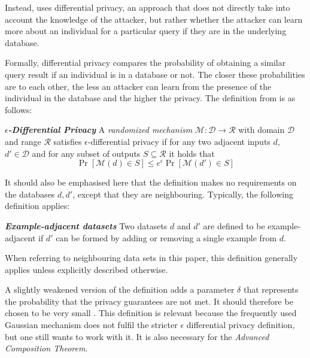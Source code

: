 Instead, \citeauthor{dwork:2006} uses differential privacy, an approach that does not directly take into account the knowledge of the attacker, but rather whether the attacker can learn more about an individual for a particular query if they are in the underlying database.

Formally, differential privacy compares the probability of obtaining a similar query result if an individual is in a database or not. The closer these probabilities are to each other, the less an attacker can learn from the presence of the individual in the database and the higher the privacy. The definition from \cite{dwork:2006} is as follows:

\begin{definition}\label{def:eps-differential-privacy}
	\emph{\textbf{$\epsilon$-Differential Privacy}} A \textit{randomized mechanism} $\mathcal{M}: \mathcal{D} \rightarrow \mathcal{R}$ with domain $\mathcal{D}$ and range $\mathcal{R}$ satisfies $\epsilon$-differential privacy if for any two adjacent inputs $d$, $d' \in \mathcal{D}$ and for any subset of outputs $S \subseteq \mathcal{R}$ it holds that $$\Pr[\mathcal{M}(d) \in S] \leq e^{\epsilon} \Pr[\mathcal{M}(d') \in S]$$
\end{definition}

It should also be emphasised here that the definition makes no requirements on the databases $d, d'$, except that they are neighbouring. Typically, the following definition applies:
\begin{definition}\label{def:example-adjacency}
	\emph{\textbf{Example-adjacent datasets}} Two datasets $d$ and $d'$ are defined to be example-adjacent if $d'$ can be formed by adding or removing a single example from $d$.
\end{definition}

When referring to neighbouring data sets in this paper, this definition generally applies unless explicitly described otherwise.

A slightly weakened version of the definition adds a parameter $\delta$ that represents the probability that the privacy guarantees are not met. It should therefore be chosen to be very small \cite{dwork:2014}. This definition is relevant because the frequently used Gaussian mechanism does not fulfil the stricter $\epsilon$ differential privacy definition, but one still wants to work with it. It is also necessary for the \textit{Advanced Composition Theorem}.


